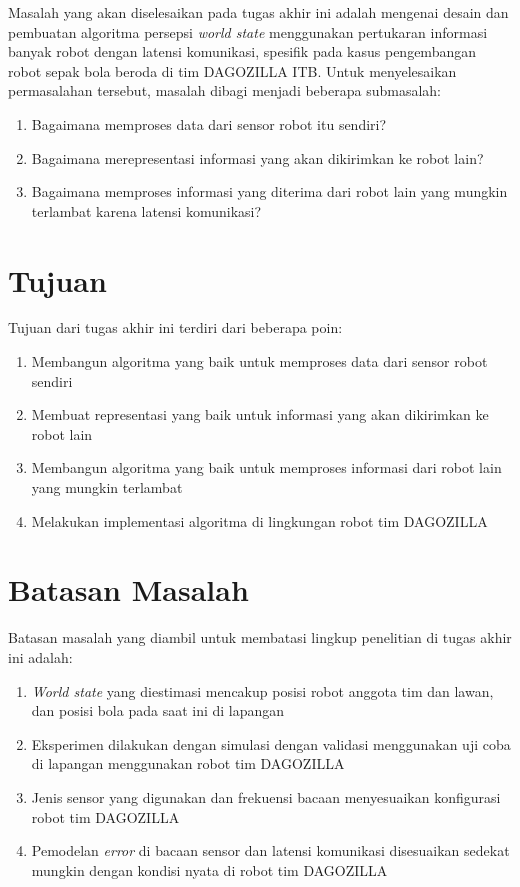Masalah yang akan diselesaikan pada tugas akhir ini adalah mengenai desain dan pembuatan algoritma persepsi \textit{world state} menggunakan pertukaran informasi banyak robot dengan latensi komunikasi, spesifik pada kasus pengembangan robot sepak bola beroda di tim DAGOZILLA ITB. Untuk menyelesaikan permasalahan tersebut, masalah dibagi menjadi beberapa submasalah:

\begin{enumerate}
    \item Bagaimana memproses data dari sensor robot itu sendiri?
    \item Bagaimana merepresentasi informasi yang akan dikirimkan ke robot lain?
    \item Bagaimana memproses informasi yang diterima dari robot lain yang mungkin terlambat karena latensi komunikasi?
\end{enumerate}

\section{Tujuan}

Tujuan dari tugas akhir ini terdiri dari beberapa poin:

\begin{enumerate}
    \item Membangun algoritma yang baik untuk memproses data dari sensor robot sendiri
    \item Membuat representasi yang baik untuk informasi yang akan dikirimkan ke robot lain
    \item Membangun algoritma yang baik untuk memproses informasi dari robot lain yang mungkin terlambat
    \item Melakukan implementasi algoritma di lingkungan robot tim DAGOZILLA
\end{enumerate}

\section{Batasan Masalah}

Batasan masalah yang diambil untuk membatasi lingkup penelitian di tugas akhir ini adalah:

\begin{enumerate}
    \item \textit{World state} yang diestimasi mencakup posisi robot anggota tim dan lawan, dan posisi bola pada saat ini di lapangan
    \item Eksperimen dilakukan dengan simulasi dengan validasi menggunakan uji coba di lapangan menggunakan robot tim DAGOZILLA
    \item Jenis sensor yang digunakan dan frekuensi bacaan menyesuaikan konfigurasi robot tim DAGOZILLA
    \item Pemodelan \textit{error} di bacaan sensor dan latensi komunikasi disesuaikan sedekat mungkin dengan kondisi nyata di robot tim DAGOZILLA
\end{enumerate}

